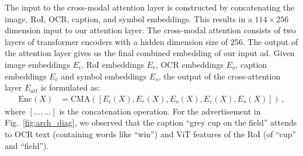 The input to the cross-modal attention layer is constructed by concatenating the image, RoI, OCR, caption, and symbol embeddings. This results in a $114 \times 256$ dimension input to our attention layer. The cross-modal attention consists of two layers of transformer encoders with a hidden dimension size of $256$. %
The output of the attention layer gives us the final combined embedding of our input ad. 
Given image embeddings $E_i$, RoI embeddings $E_r$, OCR embeddings $E_o$, caption embeddings $E_c$ and symbol embeddings $E_s$, the output of the cross-attention layer $E_{att}$ is formulated as:
\begin{align}
        \text{Enc}(X) &= \text{CMA}(\left[E_i(X),E_r(X), E_o(X),E_c(X),E_s(X)\right])\,, \nonumber
\end{align}
where $[\ldots,\ldots]$ is the concatenation operation. For the advertisement in Fig.~\ref{fig:arch_diag}, we observed that the caption ``grey cup on the field'' attends to OCR text (containing words like ``win'') and ViT features of the RoI (of ``cup'' and ``field'').




